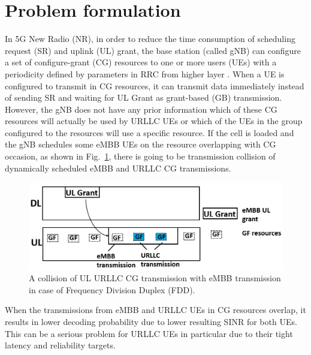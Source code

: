 \documentclass{report}
\begin{document}
\section{Problem formulation}

In 5G New Radio (NR),  in order to reduce the time consumption of scheduling request (SR) and uplink (UL) grant, the base station (called gNB) can configure a set of configure-grant (CG) resources to one or more users (UEs) with a periodicity defined by parameters in RRC from higher layer \cite{ad3}. When a UE is configured to transmit in CG resources, it can transmit data immediately instead of sending SR and waiting for UL Grant as grant-based (GB) transmission. However, the gNB does not have any prior information which of these CG resources will actually be used by URLLC UEs or which of the UEs in the group configured to the resources will use a specific resource. If the cell is loaded and the gNB schedules some eMBB UEs on the resource overlapping with CG occasion, as shown in Fig.~\ref{fig1}, there is going to be transmission collision of dynamically scheduled eMBB and URLLC CG transmissions. 

\begin{figure}[htbp]
\centerline{\includegraphics[scale=0.3]{fig1.PNG}}
\caption{A collision of UL URLLC CG transmission with eMBB transmission in case of Frequency Division Duplex (FDD).}
\label{fig1}
\end{figure}

When the transmissions from eMBB and URLLC UEs in CG resources overlap, it results in lower decoding probability due to lower resulting SINR for both UEs. This can be a serious problem for URLLC UEs in particular due to their tight latency and reliability targets.
\end{document}
